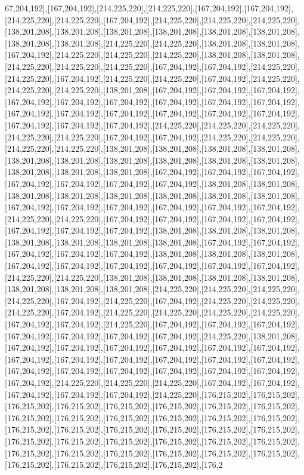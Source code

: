 67,204,192],[167,204,192],[214,225,220],[214,225,220],[167,204,192],[167,204,192],[214,225,220],[214,225,220],[167,204,192],[214,225,220],[214,225,220],[214,225,220],[138,201,208],[138,201,208],[138,201,208],[138,201,208],[138,201,208],[138,201,208],[138,201,208],[138,201,208],[214,225,220],[214,225,220],[138,201,208],[138,201,208],[167,204,192],[214,225,220],[214,225,220],[214,225,220],[138,201,208],[138,201,208],[214,225,220],[214,225,220],[214,225,220],[167,204,192],[167,204,192],[214,225,220],[214,225,220],[167,204,192],[214,225,220],[214,225,220],[167,204,192],[214,225,220],[214,225,220],[214,225,220],[138,201,208],[167,204,192],[167,204,192],[167,204,192],[167,204,192],[167,204,192],[167,204,192],[167,204,192],[167,204,192],[167,204,192],[167,204,192],[167,204,192],[167,204,192],[167,204,192],[167,204,192],[167,204,192],[167,204,192],[167,204,192],[167,204,192],[214,225,220],[214,225,220],[214,225,220],[214,225,220],[214,225,220],[167,204,192],[167,204,192],[214,225,220],[214,225,220],[214,225,220],[214,225,220],[138,201,208],[138,201,208],[138,201,208],[138,201,208],[138,201,208],[138,201,208],[138,201,208],[138,201,208],[138,201,208],[138,201,208],[138,201,208],[138,201,208],[138,201,208],[167,204,192],[167,204,192],[167,204,192],[167,204,192],[167,204,192],[167,204,192],[167,204,192],[138,201,208],[138,201,208],[138,201,208],[138,201,208],[138,201,208],[138,201,208],[138,201,208],[138,201,208],[167,204,192],[167,204,192],[167,204,192],[167,204,192],[167,204,192],[167,204,192],[214,225,220],[214,225,220],[167,204,192],[167,204,192],[167,204,192],[167,204,192],[167,204,192],[167,204,192],[167,204,192],[138,201,208],[138,201,208],[138,201,208],[138,201,208],[138,201,208],[138,201,208],[138,201,208],[167,204,192],[167,204,192],[167,204,192],[167,204,192],[167,204,192],[138,201,208],[138,201,208],[138,201,208],[167,204,192],[167,204,192],[167,204,192],[167,204,192],[167,204,192],[167,204,192],[214,225,220],[214,225,220],[138,201,208],[138,201,208],[138,201,208],[138,201,208],[138,201,208],[138,201,208],[138,201,208],[214,225,220],[214,225,220],[214,225,220],[214,225,220],[167,204,192],[214,225,220],[167,204,192],[214,225,220],[214,225,220],[214,225,220],[167,204,192],[214,225,220],[214,225,220],[214,225,220],[214,225,220],[167,204,192],[167,204,192],[214,225,220],[167,204,192],[167,204,192],[167,204,192],[167,204,192],[167,204,192],[167,204,192],[167,204,192],[214,225,220],[138,201,208],[167,204,192],[167,204,192],[167,204,192],[167,204,192],[167,204,192],[167,204,192],[167,204,192],[167,204,192],[167,204,192],[167,204,192],[167,204,192],[167,204,192],[167,204,192],[167,204,192],[167,204,192],[167,204,192],[167,204,192],[167,204,192],[167,204,192],[214,225,220],[214,225,220],[214,225,220],[167,204,192],[167,204,192],[167,204,192],[167,204,192],[167,204,192],[214,225,220],[176,215,202],[176,215,202],[176,215,202],[176,215,202],[176,215,202],[176,215,202],[176,215,202],[176,215,202],[176,215,202],[176,215,202],[176,215,202],[176,215,202],[176,215,202],[176,215,202],[176,215,202],[176,215,202],[176,215,202],[176,215,202],[176,215,202],[176,215,202],[176,215,202],[176,215,202],[176,215,202],[176,215,202],[176,215,202],[176,215,202],[176,215,202],[176,215,202],[176,215,202],[176,215,202],[176,215,202],[176,215,202],[176,215,202],[176,215,202],[176,215,202],[176,215,202],[176,2